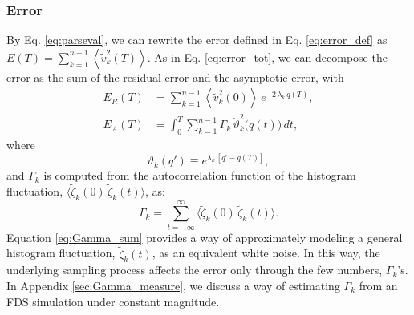 \documentclass[reprint, superscriptaddress, floatfix]{revtex4-1}
\newcommand{\Err}{E}
\begin{document}
\subsubsection{Error}



By Eq. \eqref{eq:parseval},
we can rewrite the error defined in Eq. \eqref{eq:error_def} as
$\Err(T) = \sum_{k = 1}^{n - 1} \left\langle {\tilde v}_k^2(T) \right\rangle$.
%
%
As in Eq. \eqref{eq:error_tot},
we can decompose the error as the sum
of the residual error and the asymptotic error, with
\begin{align}
  \Err_R(T)
  &=
  \sum_{k = 1}^{n-1}
    \left\langle
      {\tilde v}_k^2(0)
    \right\rangle \,
    e^{ - 2 \, \lambda_k  \, q(T) }
  ,
  \label{eq:error_res}
  \\
  \Err_A(T)
  &=
  \int_0^T
  \sum_{k = 1}^{n-1}
  \Gamma_k \, \dot \vartheta_k^2\bigl( q(t) \bigr) \, dt
  ,
  \label{eq:error_asym}
\end{align}
%
where
%
\begin{equation}
  \vartheta_k(q') \equiv e^{\lambda_k \, [q' - q(T)]}
  ,
  \label{eq:uk_def}
\end{equation}
%
and $\Gamma_k$ is computed from
the autocorrelation function
of the histogram fluctuation,
$\bigl\langle {\tilde \zeta}_k(0)
\, {\tilde \zeta}_k(t) \bigr\rangle$,
as:
%
\begin{equation}
  \Gamma_k
  = \sum_{t = -\infty}^\infty
  \bigl\langle {\tilde \zeta}_k(0)
            \, {\tilde \zeta}_k(t) \bigr\rangle
  .
  \label{eq:Gamma_sum}
\end{equation}
%
%
Equation \eqref{eq:Gamma_sum} provides a way
of approximately modeling
a general histogram fluctuation, ${\tilde \zeta}_k(t)$,
as an equivalent white noise.
In this way,
the underlying sampling process
affects the error only through the
few numbers, $\Gamma_k$'s.
%
In Appendix \ref{sec:Gamma_measure},
we discuss a way of estimating $\Gamma_k$
from an FDS simulation under constant magnitude.
%



\end{document}
